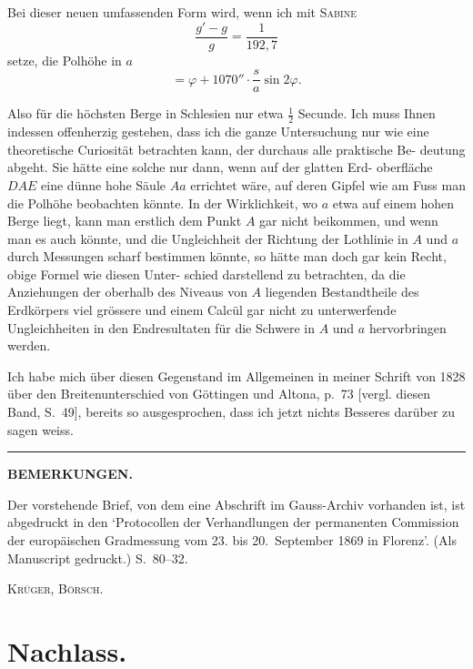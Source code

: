 \documentclass[12pt,a4paper]{article}
\theoremstyle{plain}
\theoremstyle{definition}
\theoremstyle{remark}
\begin{document}
Bei dieser neuen umfassenden Form wird, wenn ich mit \textsc{Sabine}
\[
\frac{g' - g}{g} = \frac{1}{192{,}7}
\]
setze, die Polhöhe in $a$
\[
= \varphi + 1070'' \cdot \frac{s}{a} \sin 2\varphi.
\]

Also für die höchsten Berge in Schlesien nur etwa $\tfrac{1}{2}$ Secunde. Ich muss
Ihnen indessen offenherzig gestehen, dass ich die ganze Untersuchung nur wie
eine theoretische Curiosität betrachten kann, der durchaus alle praktische Be-\newline
deutung abgeht. Sie hätte eine solche nur dann, wenn auf der glatten Erd-\newline
oberfläche $DAE$ eine dünne hohe Säule $Aa$ errichtet wäre, auf deren Gipfel
wie am Fuss man die Polhöhe beobachten könnte. In der Wirklichkeit, wo
$a$ etwa auf einem hohen Berge liegt, kann man erstlich dem Punkt $A$ gar
nicht beikommen, und wenn man es auch könnte, und die Ungleichheit der
Richtung der Lothlinie in $A$ und $a$ durch Messungen scharf bestimmen
könnte, so hätte man doch gar kein Recht, obige Formel wie diesen Unter-\newline
schied darstellend zu betrachten, da die Anziehungen der oberhalb des
Niveaus von $A$ liegenden Bestandtheile des Erdkörpers viel grössere und
einem Calcül gar nicht zu unterwerfende Ungleichheiten in den Endresultaten
für die Schwere in $A$ und $a$ hervorbringen werden.

Ich habe mich über diesen Gegenstand im Allgemeinen in meiner Schrift
von 1828 über den Breitenunterschied von Göttingen und Altona, p.~73 [vergl.
diesen Band, S.~49], bereits so ausgesprochen, dass ich jetzt nichts Besseres
darüber zu sagen weiss.

\bigskip
\begin{center}
\rule{0.4\textwidth}{0.4pt}
\end{center}
\bigskip

\begin{center}
\textbf{BEMERKUNGEN.}
\end{center}

Der vorstehende Brief, von dem eine Abschrift im Gauss-Archiv vorhanden ist, ist abgedruckt in den
`Protocollen der Verhandlungen der permanenten Commission der europäischen Gradmessung vom 23. bis
20.~September 1869 in Florenz\kern0pt'. (Als Manuscript gedruckt.) S.~80--32.

\hfill \textsc{Krüger, Börsch.}

\newpage
\section*{Nachlass.}
\end{document}
